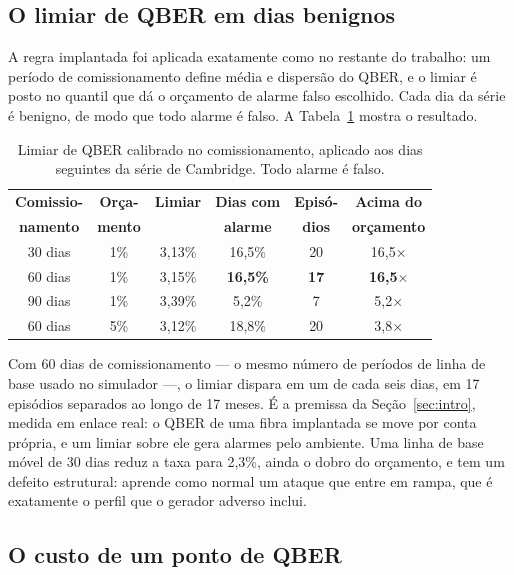 \documentclass[12pt]{article}
\begin{document}
\subsection{O limiar de QBER em dias benignos}

A regra implantada foi aplicada exatamente como no restante do trabalho: um
período de comissionamento define média e dispersão do QBER, e o limiar é posto no
quantil que dá o orçamento de alarme falso escolhido. Cada dia da série é benigno,
de modo que todo alarme é falso. A Tabela~\ref{tab:campo_limiar} mostra o
resultado.

\begin{table}[htbp]
\centering
\caption{Limiar de QBER calibrado no comissionamento, aplicado aos dias
seguintes da série de Cambridge. Todo alarme é falso.}
\label{tab:campo_limiar}
\footnotesize
\setlength{\tabcolsep}{4.5pt}
\begin{tabular}{@{}cccccc@{}}
\toprule
\textbf{Comissio-} & \textbf{Orça-} & \textbf{Limiar} & \textbf{Dias com} & \textbf{Episó-} & \textbf{Acima do} \\
\textbf{namento} & \textbf{mento} & & \textbf{alarme} & \textbf{dios} & \textbf{orçamento} \\
\midrule
30 dias & 1\% & 3,13\% & 16,5\% & 20 & 16,5$\times$ \\
60 dias & 1\% & 3,15\% & \textbf{16,5\%} & \textbf{17} & \textbf{16,5$\times$} \\
90 dias & 1\% & 3,39\% & 5,2\% & 7 & 5,2$\times$ \\
60 dias & 5\% & 3,12\% & 18,8\% & 20 & 3,8$\times$ \\
\bottomrule
\end{tabular}
\end{table}

Com 60 dias de comissionamento --- o mesmo número de períodos de linha de base
usado no simulador ---, o limiar dispara em um de cada seis dias, em 17 episódios
separados ao longo de 17 meses. É a premissa da Seção~\ref{sec:intro}, medida em enlace real: o
QBER de uma fibra implantada se move por conta própria, e um limiar sobre ele
gera alarmes pelo ambiente. Uma linha de base móvel de 30 dias reduz a taxa para
2,3\%, ainda o dobro do orçamento, e tem um defeito estrutural: aprende como
normal um ataque que entre em rampa, que é exatamente o perfil que o gerador
adverso inclui.

\subsection{O custo de um ponto de QBER}
\end{document}
